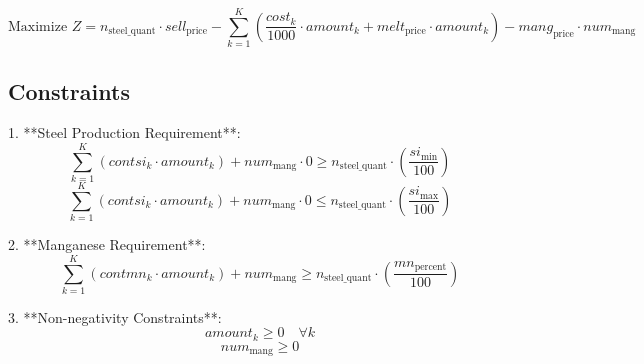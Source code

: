 \documentclass{article}
\begin{document}
\[
\text{Maximize } Z = n_{\text{steel\_quant}} \cdot sell_{\text{price}} - \sum_{k=1}^{K} \left( \frac{cost_k}{1000} \cdot amount_k + melt_{\text{price}} \cdot amount_k \right) - mang_{\text{price}} \cdot num_{\text{mang}}
\]

\subsection*{Constraints}

1. **Steel Production Requirement**:
\[
\sum_{k=1}^{K} \left( contsi_k \cdot amount_k \right) + num_{\text{mang}} \cdot 0 \geq n_{\text{steel\_quant}} \cdot \left( \frac{si_{\text{min}}}{100} \right)
\]
\[
\sum_{k=1}^{K} \left( contsi_k \cdot amount_k \right) + num_{\text{mang}} \cdot 0 \leq n_{\text{steel\_quant}} \cdot \left( \frac{si_{\text{max}}}{100} \right)
\]

2. **Manganese Requirement**:
\[
\sum_{k=1}^{K} \left( contmn_k \cdot amount_k \right) + num_{\text{mang}} \geq n_{\text{steel\_quant}} \cdot \left( \frac{mn_{\text{percent}}}{100} \right)
\]

3. **Non-negativity Constraints**:
\[
amount_k \geq 0 \quad \forall k
\]
\[
num_{\text{mang}} \geq 0
\]
\end{document}
